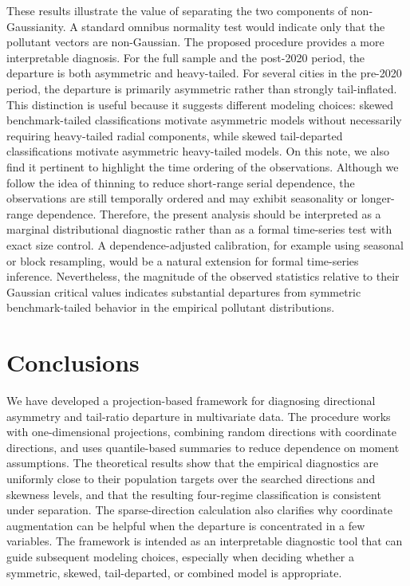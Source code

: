 \documentclass[11pt]{article}
\theoremstyle{plain}
\theoremstyle{definition}
\theoremstyle{remark}
\begin{document}
These results illustrate the value of separating the two components of non-Gaussianity.  A standard omnibus normality test would indicate only that the pollutant vectors are non-Gaussian.  The proposed procedure provides a more interpretable diagnosis.  For the full sample and the post-2020 period, the departure is both asymmetric and heavy-tailed.  For several cities in the pre-2020 period, the departure is primarily asymmetric rather than strongly tail-inflated.  This distinction is useful because it suggests different modeling choices: skewed benchmark-tailed classifications motivate asymmetric models without necessarily requiring heavy-tailed radial components, while skewed tail-departed classifications motivate asymmetric heavy-tailed models. On this note, we also find it pertinent to highlight the time ordering of the observations. Although we follow the idea of thinning to reduce short-range serial dependence, the observations are still temporally ordered and may exhibit seasonality or longer-range dependence. Therefore, the present analysis should be interpreted as a marginal distributional diagnostic rather than as a formal time-series test with exact size control. A dependence-adjusted calibration, for example using seasonal or block resampling, would be a natural extension for formal time-series inference.  Nevertheless, the magnitude of the observed statistics relative to their Gaussian critical values indicates substantial departures from symmetric benchmark-tailed behavior in the empirical pollutant distributions.

\section{Conclusions}\label{sec:conclusions}

We have developed a projection-based framework for diagnosing directional asymmetry and tail-ratio departure in multivariate data. The procedure works with one-dimensional projections, combining random directions with coordinate directions, and uses quantile-based summaries to reduce dependence on moment assumptions. The theoretical results show that the empirical diagnostics are uniformly close to their population targets over the searched directions and skewness levels, and that the resulting four-regime classification is consistent under separation. The sparse-direction calculation also clarifies why coordinate augmentation can be helpful when the departure is concentrated in a few variables. The framework is intended as an interpretable diagnostic tool that can guide subsequent modeling choices, especially when deciding whether a symmetric, skewed, tail-departed, or combined model is appropriate.
\end{document}
